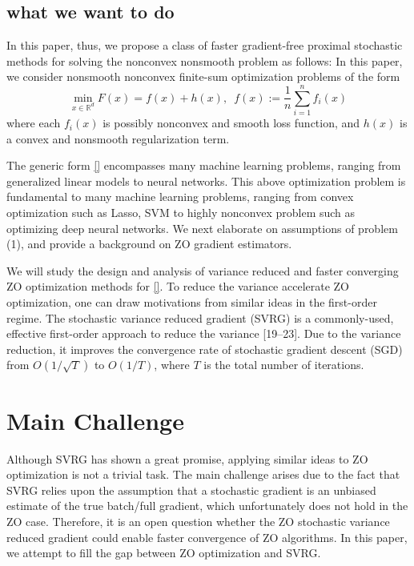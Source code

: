 \documentclass{article}
\newcommand*{\R}{\mathbb{R}}
\theoremstyle{definition}
\theoremstyle{remark}
\begin{document}
\subsection{what we want to do}
{\color{Green}\label{problem}
In this paper, thus, we propose a class of faster gradient-free proximal stochastic methods for solving the nonconvex nonsmooth problem as follows:
{\color{Violet}
In this paper, we consider nonsmooth nonconvex finite-sum optimization problems of the form
}
\begin{equation}
\min_{x\in\R^d} F(x) =  f(x) + h(x),\,\,\,f(x):=\frac{1}{n}\sum_{i=1}^n f_i(x)
\end{equation}
where each $f_i(x)$ is {\color{Violet} possibly} nonconvex and smooth loss function, and $h(x)$ is a convex and nonsmooth regularization term.}
{\color{Brown}
The generic form \eqref{} encompasses
many machine learning problems, ranging from generalized linear models to neural networks. 
{\color{Violet} This above optimization problem is fundamental to many machine learning problems, ranging from convex optimization such as Lasso, SVM to highly nonconvex problem such as optimizing deep neural networks.}
We
next elaborate on assumptions of problem (1), and provide a background on ZO gradient estimators.

We will study the design and analysis of variance reduced and faster converging ZO optimization methods for \eqref{}. To reduce the variance accelerate ZO optimization, one can draw
motivations from similar ideas in the first-order regime. The stochastic variance reduced gradient
(SVRG) is a commonly-used, effective first-order approach to reduce the variance [19–23]. Due to
the variance
reduction, it improves the convergence rate of stochastic gradient descent (SGD) from
$O(1/\sqrt{T})$ to $O(1/{T})$, where $T$ is the total number of iterations.


}

\section{Main Challenge}
{\color{Brown}
Although SVRG has shown a great promise, applying similar ideas to ZO optimization is not a trivial
task. The main challenge arises due to the fact that SVRG relies upon the assumption that a stochastic gradient is an unbiased estimate of the true batch/full gradient, which unfortunately does not hold in the ZO case. Therefore, it is an open question whether the ZO stochastic variance reduced gradient could enable faster convergence of ZO algorithms. In this paper, we attempt to fill the gap between
ZO optimization and SVRG.
}
\end{document}
